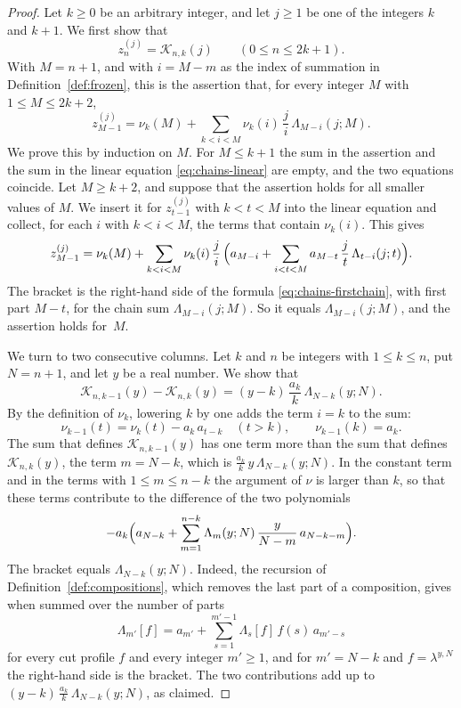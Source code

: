 \documentclass{amsart}
\theoremstyle{definition}
\theoremstyle{remark}
\numberwithin{equation}{section}
\begin{document}
\begin{proof}
Let $k\ge 0$ be an arbitrary integer, and let $j\ge 1$ be one of the integers $k$ and $k+1$. We first show that
\begin{equation}\label{eq:chains-values}
z^{(j)}_n=\mathcal K_{n,k}(j)\qquad(0\le n\le 2k+1).
\end{equation}
With $M=n+1$, and with $i=M-m$ as the index of summation in Definition~\ref{def:frozen}, this is the assertion that, for every integer $M$ with $1\le M\le 2k+2$,
\[
z^{(j)}_{M-1}=\nu_k(M)+\sum_{k<i<M}\nu_k(i)\,\frac{j}{i}\,\Lambda_{M-i}(j;M).
\]
We prove this by induction on $M$. For $M\le k+1$ the sum in the assertion and the sum in the linear equation \eqref{eq:chains-linear} are empty, and the two equations coincide. Let $M\ge k+2$, and suppose that the assertion holds for all smaller values of $M$. We insert it for $z^{(j)}_{t-1}$ with $k<t<M$ into the linear equation and collect, for each $i$ with $k<i<M$, the terms that contain $\nu_k(i)$. This gives
\[
z^{(j)}_{M-1}=\nu_k(M)+\sum_{k<i<M}\nu_k(i)\,\frac{j}{i}\,\Bigl(a_{M-i}+\sum_{i<t<M}a_{M-t}\,\frac{j}{t}\,\Lambda_{t-i}(j;t)\Bigr).
\]
The bracket is the right-hand side of the formula \eqref{eq:chains-firstchain}, with first part $M-t$, for the chain sum $\Lambda_{M-i}(j;M)$. So it equals $\Lambda_{M-i}(j;M)$, and the assertion holds for~$M$.

We turn to two consecutive columns. Let $k$ and $n$ be integers with $1\le k\le n$, put $N=n+1$, and let $y$ be a real number. We show that
\begin{equation}\label{eq:chains-knot}
\mathcal K_{n,k-1}(y)-\mathcal K_{n,k}(y)=(y-k)\,\frac{a_k}{k}\,\Lambda_{N-k}(y;N).
\end{equation}
By the definition of $\nu_k$, lowering $k$ by one adds the term $i=k$ to the sum:
\[
\nu_{k-1}(t)=\nu_k(t)-a_k\,a_{t-k}\quad(t>k),\qquad\nu_{k-1}(k)=a_k.
\]
The sum that defines $\mathcal K_{n,k-1}(y)$ has one term more than the sum that defines $\mathcal K_{n,k}(y)$, the term $m=N-k$, which is $\frac{a_k}{k}\,y\,\Lambda_{N-k}(y;N)$. In the constant term and in the terms with $1\le m\le n-k$ the argument of $\nu$ is larger than $k$, so that these terms contribute to the difference of the two polynomials
\[
-a_k\Bigl(a_{N-k}+\sum_{m=1}^{n-k}\Lambda_m(y;N)\,\frac{y}{N-m}\,a_{N-k-m}\Bigr).
\]
The bracket equals $\Lambda_{N-k}(y;N)$. Indeed, the recursion of Definition~\ref{def:compositions}, which removes the last part of a composition, gives when summed over the number of parts
\[
\Lambda_{m'}[f]=a_{m'}+\sum_{s=1}^{m'-1}\Lambda_s[f]\,f(s)\,a_{m'-s}
\]
for every cut profile $f$ and every integer $m'\ge 1$, and for $m'=N-k$ and $f=\lambda^{y,N}$ the right-hand side is the bracket. The two contributions add up to $(y-k)\,\frac{a_k}{k}\,\Lambda_{N-k}(y;N)$, as claimed.


\end{proof}
\end{document}

